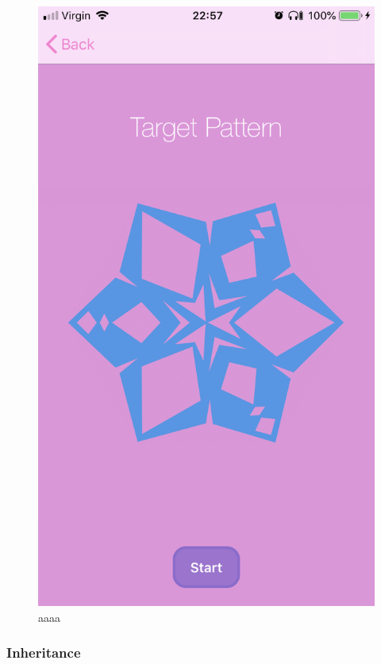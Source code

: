 \documentclass[11pt]{article}
\begin{document}
\begin{figure}[!ht]
\begin{minipage}{0.45\textwidth}
                            \includegraphics[width=0.7\linewidth]{KiriZen/complexTarget.png}
                            \caption{aaaa}
                            \label{fig:kiriZen-complexTarget}
                        \end{minipage}
                    \end{figure}
                    
        \subsubsection{Inheritance}
    
\end{document}
